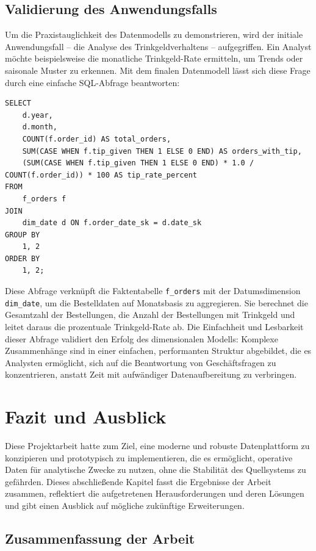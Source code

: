 \documentclass[
    12pt,               
    a4paper,        
    ngerman            
]{scrartcl}
\begin{document}
\subsection{Validierung des Anwendungsfalls}
\label{sec:validierung}

Um die Praxistauglichkeit des Datenmodells zu demonstrieren, wird der initiale Anwendungsfall – die Analyse des Trinkgeldverhaltens – aufgegriffen. Ein Analyst möchte beispielsweise die monatliche Trinkgeld-Rate ermitteln, um Trends oder saisonale Muster zu erkennen. Mit dem finalen Datenmodell lässt sich diese Frage durch eine einfache SQL-Abfrage beantworten:

\begin{verbatim}
SELECT
    d.year,
    d.month,
    COUNT(f.order_id) AS total_orders,
    SUM(CASE WHEN f.tip_given THEN 1 ELSE 0 END) AS orders_with_tip,
    (SUM(CASE WHEN f.tip_given THEN 1 ELSE 0 END) * 1.0 / COUNT(f.order_id)) * 100 AS tip_rate_percent
FROM
    f_orders f
JOIN
    dim_date d ON f.order_date_sk = d.date_sk
GROUP BY
    1, 2
ORDER BY
    1, 2;
\end{verbatim}

Diese Abfrage verknüpft die Faktentabelle \texttt{f\_orders} mit der Datumsdimension \texttt{dim\_date}, um die Bestelldaten auf Monatsbasis zu aggregieren. Sie berechnet die Gesamtzahl der Bestellungen, die Anzahl der Bestellungen mit Trinkgeld und leitet daraus die prozentuale Trinkgeld-Rate ab. Die Einfachheit und Lesbarkeit dieser Abfrage validiert den Erfolg des dimensionalen Modells: Komplexe Zusammenhänge sind in einer einfachen, performanten Struktur abgebildet, die es Analysten ermöglicht, sich auf die Beantwortung von Geschäftsfragen zu konzentrieren, anstatt Zeit mit aufwändiger Datenaufbereitung zu verbringen.

\section{Fazit und Ausblick}
\label{chap:fazit}

Diese Projektarbeit hatte zum Ziel, eine moderne und robuste Datenplattform zu konzipieren und prototypisch zu implementieren, die es ermöglicht, operative Daten für analytische Zwecke zu nutzen, ohne die Stabilität des Quellsystems zu gefährden. Dieses abschließende Kapitel fasst die Ergebnisse der Arbeit zusammen, reflektiert die aufgetretenen Herausforderungen und deren Lösungen und gibt einen Ausblick auf mögliche zukünftige Erweiterungen.

\subsection{Zusammenfassung der Arbeit}
\label{sec:fazit_zusammenfassung}
\end{document}
